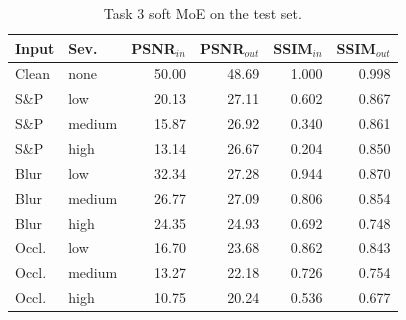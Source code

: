 \begin{table}[t]\centering\caption{Task 3 soft MoE on the test set.}\label{tab:t3}\setlength{\tabcolsep}{4pt}
\begin{tabular}{llrrrr}\toprule
Input & Sev. & PSNR$_{in}$ & PSNR$_{out}$ & SSIM$_{in}$ & SSIM$_{out}$\\ \midrule
Clean & none & 50.00 & 48.69 & 1.000 & 0.998 \\
S\&P & low & 20.13 & 27.11 & 0.602 & 0.867 \\
S\&P & medium & 15.87 & 26.92 & 0.340 & 0.861 \\
S\&P & high & 13.14 & 26.67 & 0.204 & 0.850 \\
Blur & low & 32.34 & 27.28 & 0.944 & 0.870 \\
Blur & medium & 26.77 & 27.09 & 0.806 & 0.854 \\
Blur & high & 24.35 & 24.93 & 0.692 & 0.748 \\
Occl. & low & 16.70 & 23.68 & 0.862 & 0.843 \\
Occl. & medium & 13.27 & 22.18 & 0.726 & 0.754 \\
Occl. & high & 10.75 & 20.24 & 0.536 & 0.677 \\
\bottomrule\end{tabular}\end{table}
